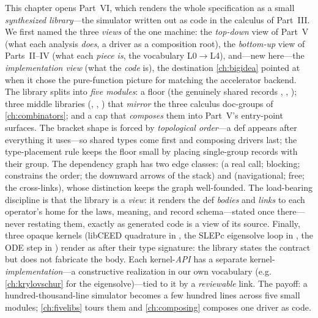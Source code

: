 \summarysection
This chapter opens Part~VI, which renders the whole specification as a small
\emph{synthesized library}---the simulator written out as code in the calculus of
Part~III. We first named the three \emph{views} of the one machine: the
\emph{top-down} view of Part~V (what each analysis \emph{does}, a driver as a
composition root), the \emph{bottom-up} view of Parts~II--IV (what each \emph{piece
is}, the vocabulary L0$\to$L4), and---new here---the \emph{implementation view} (what
the \emph{code} is), the destination \cref{ch:bigidea} pointed at when it chose the
pure-function picture for matching the accelerator backend. The library splits into
\emph{five modules}: a  floor (the genuinely shared records
, , ); three middle libraries
(, , ) that \emph{mirror} the
three calculus doc-groups of \cref{ch:combinators}; and a  cap that
\emph{composes} them into Part~V's entry-point surfaces. The bracket shape is forced
by \emph{topological order}---a def appears after everything it uses---so shared types
come first and composing drivers last; the type-placement rule keeps the floor small
by placing single-group records with their group. The dependency graph has two edge
classes:  (a real call; blocking; constrains the order; the downward
arrows of the stack) and  (navigational; free; the cross-links),
whose distinction keeps the graph well-founded. The load-bearing discipline is that
the library is a \emph{view}: it renders the def \emph{bodies} and \emph{links} to
each operator's home for the laws, meaning, and record schema---stated once
there---never restating them, exactly as generated code is a view of its source.
Finally, three opaque kernels (libCEED quadrature in , the SLEPc
eigensolve loop in , the ODE step in ) render as
 after their type signature: the library states the contract but
does not fabricate the body. Each  kernel-\emph{API} has a separate
kernel-\emph{implementation}---a constructive realization in our own vocabulary
(e.g. \cref{ch:krylovschur} for the eigensolve)---tied to it by a \emph{reviewable}
 link. The payoff: a hundred-thousand-line simulator becomes
a few hundred lines across five small modules; \cref{ch:fivelibs} tours them and
\cref{ch:composing} composes one driver as code.

